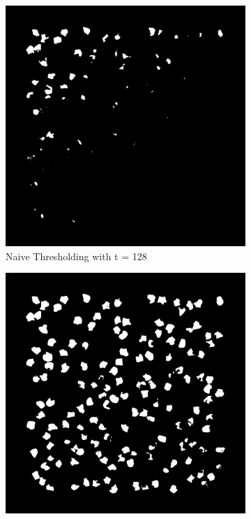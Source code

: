 \documentclass[%
	a4paper, %
	12pt, %
	english, %
	bibtotoc %
]{scrartcl}
\begin{document}
\begin{figure}[H]
    \centering
    \begin{subfigure}[b]{0.4\textwidth}
        \centering
        \includegraphics[width=\textwidth]{naive_thresholding_based_img.jpg}
        \caption{Naive Thresholding with t = 128}
        \label{fig:naive_thresholding_based_img}
    \end{subfigure}
    \hspace{1cm} %
    \begin{subfigure}[b]{0.4\textwidth}
        \centering
        \includegraphics[width=\textwidth]{otsu_segmentation.jpg}

\end{subfigure}
\end{figure}
\end{document}
